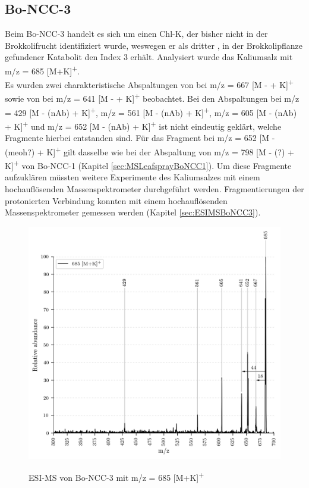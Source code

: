 \subsection{Bo-NCC-3}

Beim Bo-NCC-3 handelt es sich um einen \gls{Chl-K}, der bisher nicht in der Brokkolifrucht identifiziert wurde, weswegen er als dritter \cite{ChlorophyllCatabolitesBroccoli}, in der Brokkolipflanze gefundener Katabolit den Index 3 erhält. Analysiert wurde das Kaliumsalz mit m/z = 685 [M+K]\textsuperscript{+}. \\

Es wurden zwei charakteristische Abspaltungen von  bei m/z = 667 [M -  + K]\textsuperscript{+} sowie von  bei m/z = 641 [M -  + K]\textsuperscript{+} beobachtet. Bei den Abspaltungen bei m/z = 429 [M - (\gls{nAb}) + K]\textsuperscript{+}, m/z = 561 [M - (\gls{nAb}) + K]\textsuperscript{+}, m/z = 605 [M - (\gls{nAb}) + K]\textsuperscript{+} und m/z = 652 [M - (\gls{nAb}) + K]\textsuperscript{+} ist nicht eindeutig geklärt, welche Fragmente hierbei entstanden sind. Für das Fragment bei m/z = 652 [M - (\gls{meoh}?) + K]\textsuperscript{+} gilt dasselbe wie bei der Abspaltung von m/z = 798 [M - (?) + K]\textsuperscript{+} von Bo-NCC-1 (Kapitel \ref{sec:MSLeafsprayBoNCC1}). Um diese Fragmente aufzuklären müssten weitere Experimente des Kaliumsalzes mit einem hochauflösenden Massenspektrometer durchgeführt werden. Fragmentierungen der protonierten Verbindung konnten mit einem hochauflösenden Massenspektrometer gemessen werden (Kapitel \ref{sec:ESIMSBoNCC3}).

\begin{figure}[htbp]
  \includegraphics[width=\textwidth, height=0.7\textwidth]{figures/Kapitel4/Kataboliten/VWA_MS_LeafSpray_685.png}
  \label{fig:685MKLeafspray}
  
  \caption[ESI-MS von Bo-NCC-3, Quelle: Autor]{ESI-MS von Bo-NCC-3 mit m/z = 685 [M+K]\textsuperscript{+}}
\end{figure}

